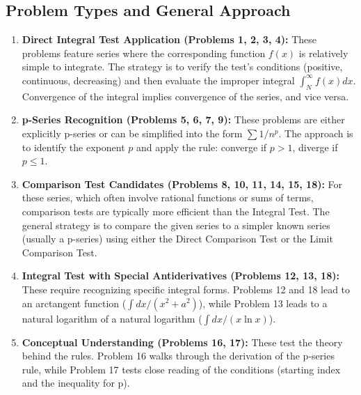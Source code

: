 \documentclass{article}
\begin{document}
\subsection{Problem Types and General Approach}
\begin{enumerate}
    \item \textbf{Direct Integral Test Application (Problems 1, 2, 3, 4):} These problems feature series where the corresponding function $f(x)$ is relatively simple to integrate. The strategy is to verify the test's conditions (positive, continuous, decreasing) and then evaluate the improper integral $\int_N^\infty f(x) dx$. Convergence of the integral implies convergence of the series, and vice versa.

    \item \textbf{p-Series Recognition (Problems 5, 6, 7, 9):} These problems are either explicitly p-series or can be simplified into the form $\sum 1/n^p$. The approach is to identify the exponent $p$ and apply the rule: converge if $p>1$, diverge if $p \le 1$.

    \item \textbf{Comparison Test Candidates (Problems 8, 10, 11, 14, 15, 18):} For these series, which often involve rational functions or sums of terms, comparison tests are typically more efficient than the Integral Test. The general strategy is to compare the given series to a simpler known series (usually a p-series) using either the Direct Comparison Test or the Limit Comparison Test.

    \item \textbf{Integral Test with Special Antiderivatives (Problems 12, 13, 18):} These require recognizing specific integral forms. Problems 12 and 18 lead to an arctangent function ($\int dx/(x^2+a^2)$), while Problem 13 leads to a natural logarithm of a natural logarithm ($\int dx/(x \ln x)$).

    \item \textbf{Conceptual Understanding (Problems 16, 17):} These test the theory behind the rules. Problem 16 walks through the derivation of the p-series rule, while Problem 17 tests close reading of the conditions (starting index and the inequality for p).
\end{enumerate}
\end{document}
